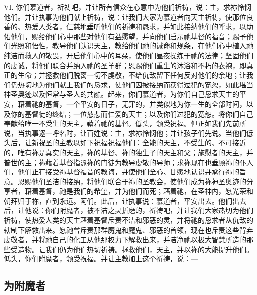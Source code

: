 VI. 你们慕道者，祈祷吧，并让所有信众在心意中为他们祈祷，说：主，求祢怜悯他们。并让执事为他们献上祈祷，说：让我们大家为慕道者向天主祈祷，使那位良善的、热爱人类者，仁慈地垂听他们的祈祷和恳求，并如此接纳他们的呼求，以助佑他们，赐给他们心中那些对他们有益愿望，并向他们启示祂基督的福音；赐予他们光照和悟性，教导他们认识天主，教给他们祂的诫命和规条，在他们心中植入祂纯洁而救人的敬畏，开启他们心中的耳朵，使他们昼夜操练于祂的法律；坚固他们的虔诚，将他们联合并纳入祂的圣羊群；恩赐他们重生的沐浴和不朽的衣袍，即真正的生命；并拯救他们脱离一切不虔敬，不给仇敌留下任何反对他们的余地；让我们仍热切地为他们献上我们的恳求，使他们因被接纳而获得过犯的宽恕，如此堪当神圣奥迹以及恒常与圣人的共融。起来，你们慕道者，为你们自己恳求天主的平安，藉着祂的基督，一个平安的日子，无罪的，并类似地为你一生的全部时间，以及你的基督徒的终结；一位慈悲而仁爱的天主；以及你们过犯的宽恕。将你们自己奉献给唯一不受生的天主，藉着祂的基督。低头，领受祝福。但正如我们先前所说，当执事逐一呼名时，让百姓说：主，求祢怜悯他；并让孩子们先说。当他们低头后，让新祝圣的主教以如下祝福祝福他们：全能的天主，不受生的、不可接近的，唯有祢是真实的天主，祢的基督、祢的独生子的天主和父；施慰者的天主，并普世的主；祢藉着基督指派祢的门徒为教导虔敬的导师；求祢现在也垂顾祢的仆人们，他们正在接受祢基督福音的教诲，并使他们全心、甘愿地认识并承行祢的旨意。恩赐他们圣洁的接纳，将他们联合于祢的圣教会，使他们成为祢神圣奥迹的分享者，藉着基督，祂是我们的希望，并为他们而死；藉着祂，在圣神内，愿光荣和朝拜归于祢，直到永远。阿们。此后，让执事说：慕道者，平安出去。他们出去后，让他说：你们附魔者，被不洁之灵折磨的，祈祷吧，并让我们大家热切为他们祈祷，使热爱人类的天主藉着基督斥责不洁和邪恶的灵，并将祂的恳求者从仇敌的辖制下解救出来。愿祂曾斥责那群魔鬼和魔鬼、邪恶的首领，现在也斥责这些背弃虔敬者，并将祂自己的化工从他那权力下解救出来，并洁净祂以极大智慧所造的那些受造物。让我们仍为他们热切祈祷。拯救他们，天主，并以祢的大能提升他们。低头，你们附魔者，领受祝福。并让主教加上这个祈祷，说：—\par


\subsection{为附魔者}

